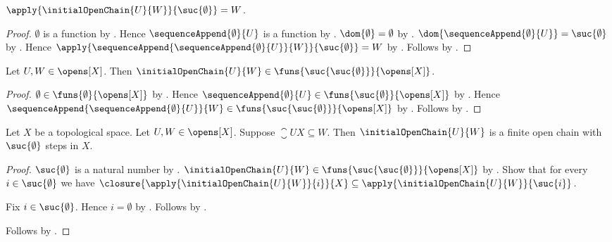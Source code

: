 \begin{proposition}\label{initial_open_chain_last}
    $\apply{\initialOpenChain{U}{W}}{\suc{\emptyset}}=W$.
\end{proposition}
\begin{proof}
    $\emptyset$ is a function by .
    Hence $\sequenceAppend{\emptyset}{U}$ is a function
        by .
    $\dom{\emptyset}=\emptyset$ by .
    $\dom{\sequenceAppend{\emptyset}{U}}=\suc{\emptyset}$
        by .
    Hence $\apply{\sequenceAppend{\sequenceAppend{\emptyset}{U}}{W}}
            {\suc{\emptyset}}=W$
        by .
    Follows by .
\end{proof}

\begin{proposition}\label{initial_open_chain_typed}
    Let $U,W\in\opens[X]$.
    Then $\initialOpenChain{U}{W}
        \in\funs{\suc{\suc{\emptyset}}}{\opens[X]}$.
\end{proposition}
\begin{proof}
    $\emptyset\in\funs{\emptyset}{\opens[X]}$
        by .
    Hence $\sequenceAppend{\emptyset}{U}
        \in\funs{\suc{\emptyset}}{\opens[X]}$
        by .
    Hence $\sequenceAppend{\sequenceAppend{\emptyset}{U}}{W}
        \in\funs{\suc{\suc{\emptyset}}}{\opens[X]}$
        by .
    Follows by .
\end{proof}

\begin{proposition}\label{initial_open_chain_is_finite_open_chain}
    Let $X$ be a topological space.
    Let $U,W\in\opens[X]$.
    Suppose $\closure{U}{X}\subseteq W$.
    Then $\initialOpenChain{U}{W}$ is a finite open chain with
        $\suc{\emptyset}$ steps in $X$.
\end{proposition}
\begin{proof}
    $\suc{\emptyset}$ is a natural number
        by .
    $\initialOpenChain{U}{W}
        \in\funs{\suc{\suc{\emptyset}}}{\opens[X]}$
        by .
    Show that for every $i\in\suc{\emptyset}$ we have
        $\closure{\apply{\initialOpenChain{U}{W}}{i}}{X}
            \subseteq\apply{\initialOpenChain{U}{W}}{\suc{i}}$.
    \begin{subproof}
        Fix $i\in\suc{\emptyset}$.
        Hence $i=\emptyset$ by .
        Follows by .
    \end{subproof}
    Follows by .
\end{proof}

